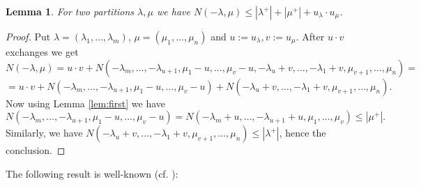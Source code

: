 \documentclass[twoside]{article}
\newtheorem{lemma}[theorem]{Lemma}
\theoremstyle{definition}
\newtheorem{remark}[theorem]{Remark}
\begin{document}

\begin{lemma}
\label{lem:sec}
For two partitions $\lambda, \mu$ we have $N(-\lambda,\mu)\leq |\lambda^+|+ |\mu^+| + u_\lambda \cdot u_\mu$.
\end{lemma}

\begin{proof}
Put $\lambda=(\lambda_1,\dots,\lambda_m)$, $\mu=(\mu_1,\dots,\mu_n)$ and $u:=u_\lambda,v:=u_\mu$. After $u\cdot v$ exchanges we get
$$ N(-\lambda,\mu)=u \cdot v+N(-\lambda_m,\dots, -\lambda_{u+1},\mu_1-u,\dots, \mu_{v}-u,-\lambda_{u}+v, \dots, -\lambda_1+v, \mu_{v+1},\dots, \mu_n)=$$
$$=u \cdot v+N(-\lambda_m,\dots, -\lambda_{u+1},\mu_1-u,\dots, \mu_{v}-u)+N(-\lambda_{u}+v, \dots, -\lambda_1+v, \mu_{v+1},\dots, \mu_n).$$
Now using Lemma \ref{lem:first} we have
$$N(-\lambda_m,\dots, -\lambda_{u+1},\mu_1-u,\dots, \mu_{v}-u) = N(-\lambda_m+u,\dots, -\lambda_{u+1}+u,\mu_1,\dots, \mu_{v})\leq |\mu^+|.$$
Similarly, we have $N(-\lambda_{u}+v, \dots, -\lambda_1+v, \mu_{v+1},\dots, \mu_n)\leq |\lambda^+|$, hence the conclusion.
\end{proof}


\vspace{0.1in}

The following result is well-known (cf. \cite{fult}):
\end{document}
